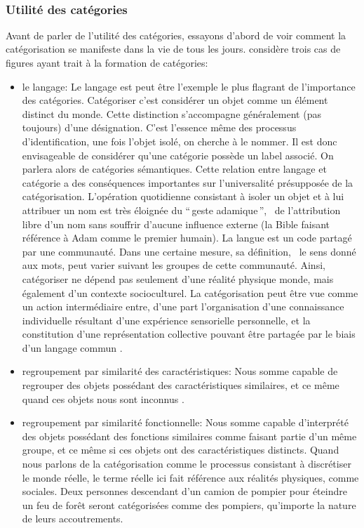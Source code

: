  \\

\subsubsection{Utilité des catégories}

Avant de parler de l'utilité des catégories, essayons d'abord de voir comment la catégorisation se manifeste dans la vie de tous les jours.  \citep{anderson1991adaptive} considère trois cas de figures ayant trait à la formation de catégories:  \\

\begin{itemize}
\item le langage: Le langage est peut être l'exemple le plus flagrant de l'importance des catégories. Catégoriser c'est considérer un objet comme un élément distinct du monde. Cette distinction s'accompagne généralement (pas toujours) d'une désignation. C'est l'essence même des processus d'identification, une fois l'objet isolé, on cherche à le nommer. Il est donc envisageable de considérer qu'une catégorie possède un label associé. On parlera alors de catégories sémantiques. Cette relation entre langage et catégorie a des conséquences importantes sur l'universalité présupposée de la catégorisation. L'opération quotidienne consistant à isoler un objet et à lui attribuer un nom est très éloignée du ``\,geste adamique\,'', \ie~de l'attribution libre d'un nom sans souffrir d'aucune influence externe (la Bible faisant référence à Adam comme le premier humain). La langue est un code partagé par une communauté. Dans une certaine mesure, sa définition, \ie~le sens donné aux mots, peut varier suivant les groupes de cette communauté. Ainsi, catégoriser ne dépend pas seulement d'une réalité physique monde, mais également d'un contexte socioculturel. La catégorisation peut être vue comme un action intermédiaire entre, d'une part l'organisation d'une connaissance individuelle résultant d'une expérience sensorielle personnelle, et la constitution d'une représentation collective pouvant être partagée par le biais d'un langage commun \citep{dubois2006cognitive}. 
\item regroupement par similarité des caractéristiques: Nous somme capable de regrouper des objets possédant des caractéristiques similaires, et ce même quand ces objets nous sont inconnus \citep{fried1984induction}.
\item regroupement par similarité fonctionnelle: Nous somme capable d'interprété des objets possédant des fonctions similaires comme faisant partie d'un même groupe, et ce même si ces objets ont des caractéristiques distincts. Quand nous parlons de la catégorisation comme le processus consistant à discrétiser le monde réelle, le terme réelle ici fait référence aux réalités physiques, comme sociales. Deux personnes descendant d'un camion de pompier pour éteindre un feu de forêt seront catégorisées comme des pompiers, qu'importe la nature de leurs accoutrements.
\end{itemize}



